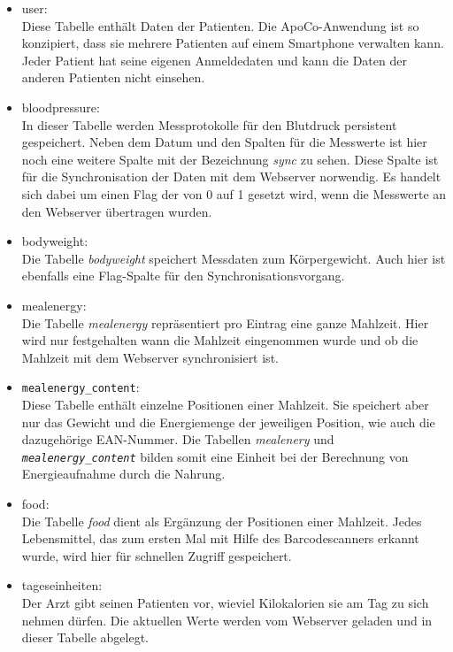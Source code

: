 \begin{itemize}
 \item user:\\
 Diese Tabelle enth\"alt Daten der Patienten.
 Die ApoCo-Anwendung ist so konzipiert, dass sie mehrere Patienten auf einem Smartphone verwalten kann.
 Jeder Patient hat seine eigenen Anmeldedaten und kann die Daten der anderen Patienten nicht einsehen.
 
 \item bloodpressure:\\
 In dieser Tabelle werden Messprotokolle f\"ur den Blutdruck persistent gespeichert.
 Neben dem Datum und den Spalten f\"ur die Messwerte ist hier noch eine weitere Spalte mit der Bezeichnung \emph{sync} zu sehen.
 Diese Spalte ist f\"ur die Synchronisation der Daten mit dem Webserver norwendig.
 Es handelt sich dabei um einen Flag der von 0 auf 1 gesetzt wird, wenn die Messwerte an den Webserver \"ubertragen wurden.
 
 \item bodyweight:\\
 Die Tabelle \emph{bodyweight} speichert Messdaten zum K\"orpergewicht.
 Auch hier ist ebenfalls eine Flag-Spalte f\"ur den Synchronisationsvorgang.
 
 \item mealenergy:\\
 Die Tabelle \emph{mealenergy} repr\"asentiert pro Eintrag eine ganze Mahlzeit.
 Hier wird nur festgehalten wann die Mahlzeit eingenommen wurde und ob die Mahlzeit mit dem Webserver synchronisiert ist.
 
 \item \texttt{mealenergy\_content}:\\
 Diese Tabelle enth\"alt einzelne Positionen einer Mahlzeit.
 Sie speichert aber nur das Gewicht und die Energiemenge der jeweiligen Position, wie auch die dazugeh\"orige EAN-Nummer.
 Die Tabellen \emph{mealenery} und \emph{\texttt{mealenergy\_content}} bilden somit eine Einheit bei der Berechnung von Energieaufnahme 
 durch die Nahrung.
 
 \item food:\\
 Die Tabelle \emph{food} dient als Erg\"anzung der Positionen einer Mahlzeit.
 Jedes Lebensmittel, das zum ersten Mal mit Hilfe des Barcodescanners erkannt wurde, wird hier f\"ur schnellen Zugriff gespeichert.
 
 \item tageseinheiten:\\
 Der Arzt gibt seinen Patienten vor, wieviel Kilokalorien sie am Tag zu sich nehmen d\"urfen.
 Die aktuellen Werte werden vom Webserver geladen und in dieser Tabelle abgelegt.
\end{itemize}

